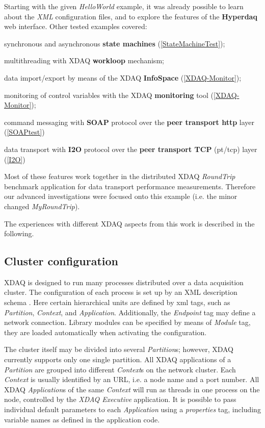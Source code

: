 Starting with the given {\em HelloWorld} example, it was already possible
to learn about the {\em XML} configuration files, and to explore the features 
of the {\bf Hyperdaq} web interface. 
Other tested examples covered:
\begin{compactitem}[$\bullet$]
 \item synchronous and asynchronous {\bf state machines} (\ref{StateMachineTest}); 
 \item multithreading with XDAQ {\bf workloop} mechanism;
 \item data import/export  by means of the XDAQ {\bf InfoSpace} (\ref{XDAQ-Monitor}); 
 \item monitoring of control variables with the XDAQ {\bf monitoring} tool (\ref{XDAQ-Monitor}); 
 \item command messaging with {\bf SOAP} protocol over the 
   {\bf peer transport http} layer (\ref{SOAPtest})
 \item data transport with {\bf I2O} protocol over the 
   {\bf peer transport TCP} (pt/tcp) layer (\ref{I2O}) 
\end{compactitem} 


Most of these features work together in the distributed XDAQ
{\em RoundTrip} benchmark application for data transport performance 
measurements. Therefore our advanced investigations were focused onto this 
example (i.e. the minor changed {\em MyRoundTrip}). 
 
The experiences with different XDAQ aspects from this work is described
in the following.

\subsection{Cluster configuration}
\label{XMLConfig}
XDAQ is designed to run many processes distributed over a data
acquisition cluster. The configuration of each process is set up by
an XML description schema \cite{XDAQ-XML}. Here certain hierarchical units are
defined by xml tags, such as {\em Partition}, {\em Context}, and  {\em Application}.
Additionally,  the {\em Endpoint} tag may define a network connection. 
Library modules can be specified by means of {\em Module} tag, they are
loaded automatically when activating the configuration.

The cluster itself may be divided into several {\em Partition}s; however,
XDAQ currently supports only one single partition.
All XDAQ applications of a {\em Partition} are grouped into different {\em Context}s 
on the network cluster. Each {\em Context} is usually identified by an URL, i.e. a
node name and a port number. All XDAQ {\em Application}s of the same 
{\em Context} will run as threads in one process on the node, controlled by the 
{\em XDAQ Executive} application. It is possible to pass individual default parameters to
each {\em Application} using a {\em properties} tag, including variable names 
as defined in the application code. 

